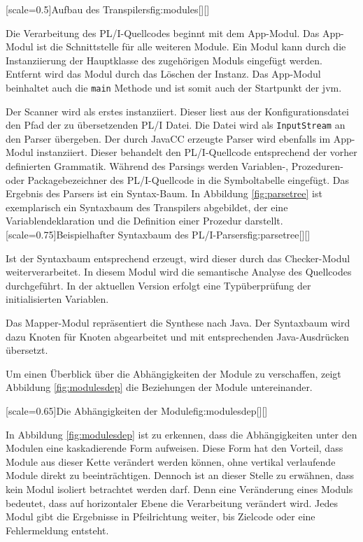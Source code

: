 [scale=0.5]{Aufbau des Transpilers}{fig:modules}[][]

Die Verarbeitung des PL/I-Quellcodes beginnt mit dem App-Modul. Das App-Modul ist die Schnittstelle für alle weiteren Module. Ein Modul kann durch die Instanziierung der Hauptklasse des zugehörigen Moduls eingefügt werden. Entfernt wird das Modul durch das Löschen der Instanz. Das App-Modul beinhaltet auch die \verb+main+ Methode und ist somit auch der Startpunkt der \ac{jvm}.

Der Scanner wird als erstes instanziiert. Dieser liest aus der Konfigurationsdatei den Pfad der zu übersetzenden PL/I Datei. Die Datei wird als \verb+InputStream+ an den Parser übergeben.
Der durch JavaCC erzeugte Parser wird ebenfalls im App-Modul instanziiert. Dieser behandelt den PL/I-Quellcode entsprechend der vorher definierten Grammatik.  Während des Parsings werden Variablen-, Prozeduren- oder Packagebezeichner des PL/I-Quellcode in die Symboltabelle eingefügt. Das Ergebnis des Parsers ist ein Syntax-Baum. 
In Abbildung \ref{fig:parsetree} ist exemplarisch ein Syntaxbaum des Transpilers abgebildet, der eine Variablendeklaration und die Definition einer Prozedur darstellt.
\pagebreak
{}[scale=0.75]{Beispielhafter Syntaxbaum des PL/I-Parsers}{fig:parsetree}[][]

Ist der Syntaxbaum entsprechend erzeugt, wird dieser durch das Checker-Modul weiterverarbeitet. In diesem Modul wird die semantische Analyse des Quellcodes durchgeführt. In der aktuellen Version erfolgt eine Typüberprüfung der initialisierten Variablen.

Das Mapper-Modul repräsentiert die Synthese nach Java. Der Syntaxbaum wird dazu Knoten für Knoten abgearbeitet und mit entsprechenden Java-Ausdrücken übersetzt.

Um einen Überblick über die Abhängigkeiten der Module zu verschaffen, zeigt
Abbildung \ref{fig:modulesdep} die Beziehungen der Module untereinander.

[scale=0.65]{Die Abhängigkeiten der Module}{fig:modulesdep}[][]
\pagebreak

In Abbildung \ref{fig:modulesdep} ist zu erkennen, dass die Abhängigkeiten unter den Modulen eine kaskadierende Form aufweisen. Diese Form hat den Vorteil, dass Module aus dieser Kette verändert werden können, ohne vertikal verlaufende Module direkt zu beeinträchtigen. Dennoch ist an dieser Stelle zu erwähnen, dass kein Modul isoliert betrachtet werden darf. Denn eine Veränderung eines Moduls bedeutet, dass auf horizontaler Ebene die Verarbeitung verändert wird. Jedes Modul gibt die Ergebnisse in Pfeilrichtung weiter, bis Zielcode oder eine Fehlermeldung entsteht.

